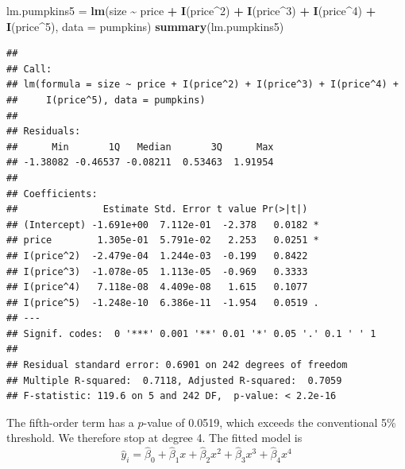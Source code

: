 \documentclass[
]{book}
\newenvironment{Shaded}{\begin{snugshade}}{\end{snugshade}}
\newcommand{\AttributeTok}[1]{\textcolor[rgb]{0.13,0.29,0.53}{#1}}
\newcommand{\DecValTok}[1]{\textcolor[rgb]{0.00,0.00,0.81}{#1}}
\newcommand{\FunctionTok}[1]{\textcolor[rgb]{0.13,0.29,0.53}{\textbf{#1}}}
\newcommand{\NormalTok}[1]{#1}
\newcommand{\OtherTok}[1]{\textcolor[rgb]{0.56,0.35,0.01}{#1}}
\newcommand{\SpecialCharTok}[1]{\textcolor[rgb]{0.81,0.36,0.00}{\textbf{#1}}}
\begin{document}
\begin{Shaded}
\begin{Highlighting}[]
\NormalTok{lm.pumpkins5 }\OtherTok{=} \FunctionTok{lm}\NormalTok{(size }\SpecialCharTok{\textasciitilde{}}\NormalTok{ price }\SpecialCharTok{+} \FunctionTok{I}\NormalTok{(price}\SpecialCharTok{\^{}}\DecValTok{2}\NormalTok{) }\SpecialCharTok{+} \FunctionTok{I}\NormalTok{(price}\SpecialCharTok{\^{}}\DecValTok{3}\NormalTok{) }\SpecialCharTok{+} \FunctionTok{I}\NormalTok{(price}\SpecialCharTok{\^{}}\DecValTok{4}\NormalTok{) }\SpecialCharTok{+}
    \FunctionTok{I}\NormalTok{(price}\SpecialCharTok{\^{}}\DecValTok{5}\NormalTok{), }\AttributeTok{data =}\NormalTok{ pumpkins)}
\FunctionTok{summary}\NormalTok{(lm.pumpkins5)}
\end{Highlighting}
\end{Shaded}

\begin{verbatim}
## 
## Call:
## lm(formula = size ~ price + I(price^2) + I(price^3) + I(price^4) + 
##     I(price^5), data = pumpkins)
## 
## Residuals:
##      Min       1Q   Median       3Q      Max 
## -1.38082 -0.46537 -0.08211  0.53463  1.91954 
## 
## Coefficients:
##               Estimate Std. Error t value Pr(>|t|)  
## (Intercept) -1.691e+00  7.112e-01  -2.378   0.0182 *
## price        1.305e-01  5.791e-02   2.253   0.0251 *
## I(price^2)  -2.479e-04  1.244e-03  -0.199   0.8422  
## I(price^3)  -1.078e-05  1.113e-05  -0.969   0.3333  
## I(price^4)   7.118e-08  4.409e-08   1.615   0.1077  
## I(price^5)  -1.248e-10  6.386e-11  -1.954   0.0519 .
## ---
## Signif. codes:  0 '***' 0.001 '**' 0.01 '*' 0.05 '.' 0.1 ' ' 1
## 
## Residual standard error: 0.6901 on 242 degrees of freedom
## Multiple R-squared:  0.7118, Adjusted R-squared:  0.7059 
## F-statistic: 119.6 on 5 and 242 DF,  p-value: < 2.2e-16
\end{verbatim}

The fifth-order term has a \(p\)-value of 0.0519, which exceeds the conventional 5\% threshold. We therefore stop at degree 4. The fitted model is
\[\hat{y}_i = \hat{\beta}_0 + \hat{\beta}_1 x + \hat{\beta}_2 x^2 + \hat{\beta}_3 x^3 + \hat{\beta}_4 x^4 \]
\end{document}
